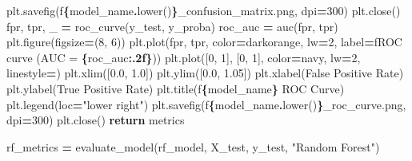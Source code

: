 \documentclass[preprint, 3p,
authoryear]{elsarticle} %
\newenvironment{Shaded}{\begin{snugshade}}{\end{snugshade}}
\newcommand{\ControlFlowTok}[1]{\textcolor[rgb]{0.13,0.29,0.53}{\textbf{#1}}}
\newcommand{\DecValTok}[1]{\textcolor[rgb]{0.00,0.00,0.81}{#1}}
\newcommand{\FloatTok}[1]{\textcolor[rgb]{0.00,0.00,0.81}{#1}}
\newcommand{\NormalTok}[1]{#1}
\newcommand{\OperatorTok}[1]{\textcolor[rgb]{0.81,0.36,0.00}{\textbf{#1}}}
\newcommand{\SpecialCharTok}[1]{\textcolor[rgb]{0.81,0.36,0.00}{\textbf{#1}}}
\newcommand{\SpecialStringTok}[1]{\textcolor[rgb]{0.31,0.60,0.02}{#1}}
\newcommand{\StringTok}[1]{\textcolor[rgb]{0.31,0.60,0.02}{#1}}
\begin{document}
\begin{Shaded}
\begin{Highlighting}[]
\NormalTok{    plt.savefig(}\SpecialStringTok{f\textquotesingle{}}\SpecialCharTok{\{}\NormalTok{model\_name}\SpecialCharTok{.}\NormalTok{lower()}\SpecialCharTok{\}}\SpecialStringTok{\_confusion\_matrix.png\textquotesingle{}}\NormalTok{, dpi}\OperatorTok{=}\DecValTok{300}\NormalTok{)}
\NormalTok{    plt.close()}
\NormalTok{    fpr, tpr, \_ }\OperatorTok{=}\NormalTok{ roc\_curve(y\_test, y\_proba)}
\NormalTok{    roc\_auc }\OperatorTok{=}\NormalTok{ auc(fpr, tpr)}
\NormalTok{    plt.figure(figsize}\OperatorTok{=}\NormalTok{(}\DecValTok{8}\NormalTok{, }\DecValTok{6}\NormalTok{))}
\NormalTok{    plt.plot(fpr, tpr, color}\OperatorTok{=}\StringTok{\textquotesingle{}darkorange\textquotesingle{}}\NormalTok{, lw}\OperatorTok{=}\DecValTok{2}\NormalTok{, label}\OperatorTok{=}\SpecialStringTok{f\textquotesingle{}ROC curve (AUC = }\SpecialCharTok{\{}\NormalTok{roc\_auc}\SpecialCharTok{:.2f\}}\SpecialStringTok{)\textquotesingle{}}\NormalTok{)}
\NormalTok{    plt.plot([}\DecValTok{0}\NormalTok{, }\DecValTok{1}\NormalTok{], [}\DecValTok{0}\NormalTok{, }\DecValTok{1}\NormalTok{], color}\OperatorTok{=}\StringTok{\textquotesingle{}navy\textquotesingle{}}\NormalTok{, lw}\OperatorTok{=}\DecValTok{2}\NormalTok{, linestyle}\OperatorTok{=}\StringTok{\textquotesingle{}{-}{-}\textquotesingle{}}\NormalTok{)}
\NormalTok{    plt.xlim([}\FloatTok{0.0}\NormalTok{, }\FloatTok{1.0}\NormalTok{])}
\NormalTok{    plt.ylim([}\FloatTok{0.0}\NormalTok{, }\FloatTok{1.05}\NormalTok{])}
\NormalTok{    plt.xlabel(}\StringTok{\textquotesingle{}False Positive Rate\textquotesingle{}}\NormalTok{)}
\NormalTok{    plt.ylabel(}\StringTok{\textquotesingle{}True Positive Rate\textquotesingle{}}\NormalTok{)}
\NormalTok{    plt.title(}\SpecialStringTok{f\textquotesingle{}}\SpecialCharTok{\{}\NormalTok{model\_name}\SpecialCharTok{\}}\SpecialStringTok{ ROC Curve\textquotesingle{}}\NormalTok{)}
\NormalTok{    plt.legend(loc}\OperatorTok{=}\StringTok{"lower right"}\NormalTok{)}
\NormalTok{    plt.savefig(}\SpecialStringTok{f\textquotesingle{}}\SpecialCharTok{\{}\NormalTok{model\_name}\SpecialCharTok{.}\NormalTok{lower()}\SpecialCharTok{\}}\SpecialStringTok{\_roc\_curve.png\textquotesingle{}}\NormalTok{, dpi}\OperatorTok{=}\DecValTok{300}\NormalTok{)}
\NormalTok{    plt.close()}
    \ControlFlowTok{return}\NormalTok{ metrics}

\NormalTok{rf\_metrics }\OperatorTok{=}\NormalTok{ evaluate\_model(rf\_model, X\_test, y\_test, }\StringTok{"Random Forest"}\NormalTok{)}
\end{Highlighting}
\end{Shaded}
\end{document}
